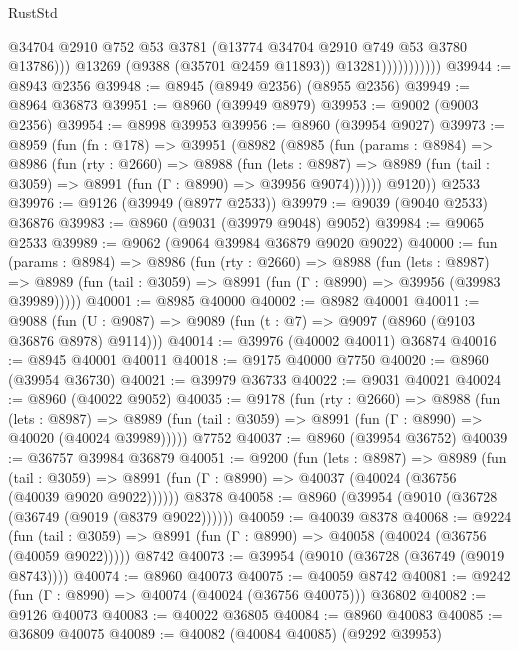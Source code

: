 \begin{lexlean}{RustStd}
\begin{coremodule}
                              @34704
                              @2910
                              @752
                              @53
                              @3781
                              (@13774 @34704 @2910 @749 @53 @3780 @13786)))
                          @13269
                          (@9388 (@35701 @2459 @11893))
                          @13281)))))))))))
@39944 := @8943 @2356
@39948 := @8945 (@8949 @2356) (@8955 @2356)
@39949 := @8964 @36873
@39951 := @8960 (@39949 @8979)
@39953 := @9002 (@9003 @2356)
@39954 := @8998 @39953
@39956 := @8960 (@39954 @9027)
@39973 := @8959
    (fun (fn : @178) =>
    @39951
      (@8982
        (@8985
          (fun (params : @8984) =>
          @8986
            (fun (rty : @2660) =>
            @8988
              (fun (lets : @8987) =>
              @8989 (fun (tail : @3059) => @8991 (fun (Γ : @8990) => @39956 @9074))))))
        @9120))
    @2533
@39976 := @9126 (@39949 (@8977 @2533))
@39979 := @9039 (@9040 @2533) @36876
@39983 := @8960 (@9031 (@39979 @9048) @9052)
@39984 := @9065 @2533
@39989 := @9062 (@9064 @39984 @36879 @9020 @9022)
@40000 := fun (params : @8984) =>
  @8986
    (fun (rty : @2660) =>
    @8988
      (fun (lets : @8987) =>
      @8989 (fun (tail : @3059) => @8991 (fun (Γ : @8990) => @39956 (@39983 @39989)))))
@40001 := @8985 @40000
@40002 := @8982 @40001
@40011 := @9088
    (fun (U : @9087) => @9089 (fun (t : @7) => @9097 (@8960 (@9103 @36876 @8978) @9114)))
@40014 := @39976 (@40002 @40011) @36874
@40016 := @8945 @40001 @40011
@40018 := @9175 @40000 @7750
@40020 := @8960 (@39954 @36730)
@40021 := @39979 @36733
@40022 := @9031 @40021
@40024 := @8960 (@40022 @9052)
@40035 := @9178
    (fun (rty : @2660) =>
    @8988
      (fun (lets : @8987) =>
      @8989 (fun (tail : @3059) => @8991 (fun (Γ : @8990) => @40020 (@40024 @39989)))))
    @7752
@40037 := @8960 (@39954 @36752)
@40039 := @36757 @39984 @36879
@40051 := @9200
    (fun (lets : @8987) =>
    @8989
      (fun (tail : @3059) =>
      @8991 (fun (Γ : @8990) => @40037 (@40024 (@36756 (@40039 @9020 @9022))))))
    @8378
@40058 := @8960 (@39954 (@9010 (@36728 (@36749 (@9019 (@8379 @9022))))))
@40059 := @40039 @8378
@40068 := @9224
    (fun (tail : @3059) => @8991 (fun (Γ : @8990) => @40058 (@40024 (@36756 (@40059 @9022)))))
    @8742
@40073 := @39954 (@9010 (@36728 (@36749 (@9019 @8743))))
@40074 := @8960 @40073
@40075 := @40059 @8742
@40081 := @9242 (fun (Γ : @8990) => @40074 (@40024 (@36756 @40075))) @36802
@40082 := @9126 @40073
@40083 := @40022 @36805
@40084 := @8960 @40083
@40085 := @36809 @40075
@40089 := @40082 (@40084 @40085) (@9292 @39953)

\end{coremodule}
\end{lexlean}
